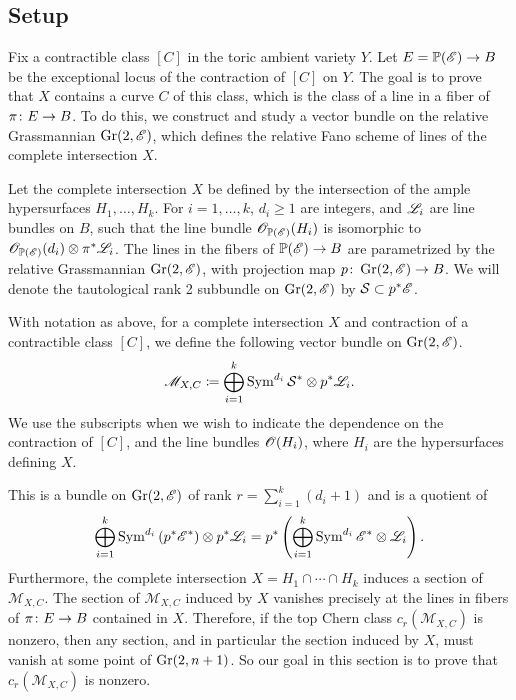 

\subsection{Setup}
Fix a contractible class $[C]$ in the toric ambient variety $Y$. Let $E = \mathbb{P}(\mathscr{E}) \to B$ be the exceptional locus of the contraction of $[C]$ on $Y$. The goal is to prove that $X$ contains a curve $C$ of this class, which is the class of a line in a fiber of $\pi \colon E \to B$. To do this, we construct and study a vector bundle on the relative Grassmannian $\operatorname{Gr}(2,\mathscr{E})$, which defines the relative Fano scheme of lines of the complete intersection $X$.  

Let the complete intersection $X$ be defined by the intersection of the ample hypersurfaces $H_1, \dots, H_k$. For $i= 1,\dots,k$, $d_i \geq 1$ are integers, and $\mathscr{L}_i$ are line bundles on $B$, such that the line bundle $\mathscr{O}_{\mathbb{P}(\mathscr{E})}(H_i)$ is isomorphic to $\mathscr{O}_{\mathbb{P}(\mathscr{E})}(d_i) \otimes \pi^*\mathscr{L}_i$. The lines in the fibers of $\mathbb{P}(\mathscr{E}) \to B$ are parametrized by the relative Grassmannian $\operatorname{Gr}(2,\mathscr{E})$, with projection map $p \colon \operatorname{Gr}(2,\mathscr{E}) \to B$. We will denote the tautological rank 2 subbundle on $\operatorname{Gr}(2,\mathscr{E})$ by $\mathcal{S} \subset p^*\mathscr{E}$.

\begin{definition}
\label{def:MDefinition}
With notation as above, for a complete intersection $X$ and contraction of a contractible class $[C]$, we define the following vector bundle on $\operatorname{Gr}(2,\mathscr{E})$.
\begin{equation}
  \label{eq:MDefinition}
  \mathscr{M}_{X,C} \coloneqq \bigoplus_{i=1}^k \operatorname{Sym}^{d_i} \mathcal{S}^* \otimes p^*\mathscr{L}_i.
\end{equation}	
We use the subscripts when we wish to indicate the dependence on the contraction of $[C]$, and the line bundles $\mathscr{O}(H_i)$, where $H_i$ are the hypersurfaces defining $X$.
\end{definition}

This is a bundle on $\operatorname{Gr}(2,\mathscr{E})$ of rank $r = \sum_{i=1}^k (d_i+1)$ and is a quotient of
\[\bigoplus_{i=1}^k \operatorname{Sym}^{d_i}\left(p^*\mathscr{E}^* \right) \otimes p^*\mathscr{L}_i = p^* \left(\bigoplus_{i=1}^k \operatorname{Sym}^{d_i}\mathscr{E}^* \otimes \mathscr{L}_i \right). \]
Furthermore, the complete intersection $X = H_1 \cap \cdots \cap H_k$ induces a section of $\mathscr{M}_{X,C}$. The section of $\mathscr{M}_{X,C}$ induced by $X$ vanishes precisely at the lines in fibers of $\pi \colon E \to B$ contained in $X$. Therefore, if the top Chern class $c_r(\mathscr{M}_{X,C})$ is nonzero, then any section, and in particular the section induced by $X$, must vanish at some point of $\operatorname{Gr}(2,n+1)$. So our goal in this section is to prove that $c_r(\mathscr{M}_{X,C})$ is nonzero.

